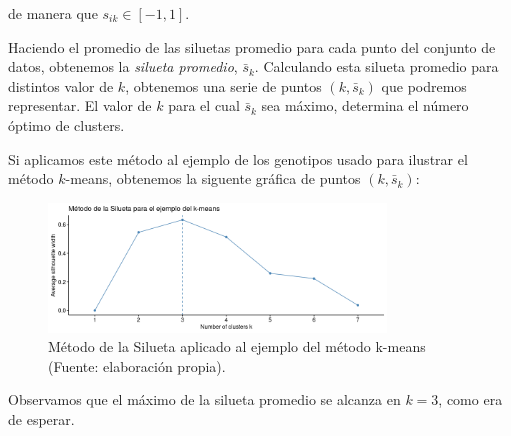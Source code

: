 de manera que $s_{ik} \in [-1,1]$.\newline

Haciendo el promedio de las siluetas promedio para cada punto del conjunto de datos, obtenemos la \textit{silueta promedio}, $\bar{s}_{k}$. Calculando esta silueta promedio para distintos valor de $k$, obtenemos una serie de 
puntos $ (k,\bar{s}_{k})$ que podremos representar. El valor de $k$ para el cual $\bar{s}_{k}$ sea máximo, determina el número óptimo de clusters. \newline

\begin{ejemplo}
    Si aplicamos este método al ejemplo de los genotipos usado para ilustrar el método $k$-means, obtenemos la siguente gráfica de puntos $(k,\bar{s}_{k})$:
    \begin{figure}[h]
        \centering
        \includegraphics[width=0.8\textwidth]{../img/silueta.png}
        \caption{Método de la Silueta aplicado al ejemplo del método k-means (Fuente: elaboración propia).}
    \end{figure}

    Observamos que el máximo de la silueta promedio se alcanza en $k=3$, como era de esperar.
\end{ejemplo}